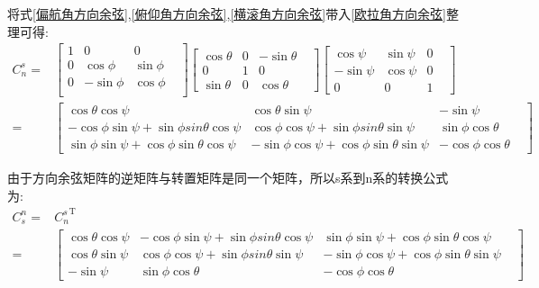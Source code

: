 \documentclass[12pt,a4paper]{article}
\begin{document}
将式\ref{偏航角方向余弦},\ref{俯仰角方向余弦},\ref{横滚角方向余弦}带入\ref{欧拉角方向余弦}整理可得:
\begin{equation}\label{欧拉角s转n}
    \begin{split} 
        C^s_n=&\left[\begin{matrix}
                1 &           0 &          0 & \\
                0 &  \cos{\phi} & \sin{\phi} & \\
                0 & -\sin{\phi} & \cos{\phi} & \\
                \end{matrix}\right]
                \left[\begin{matrix}
                \cos{\theta} & 0 & -\sin{\theta} & \\
                           0 & 1 &           0 & \\
                \sin{\theta} & 0 &  \cos{\theta} &
                \end{matrix}\right]
                \left[\begin{matrix}
                 \cos{\psi} & \sin{\psi} & 0 & \\
                -\sin{\psi} & \cos{\psi} & 0 & \\
                          0 &          0 & 1 &
                \end{matrix}\right] \\
                =&\left[\begin{matrix}
                \cos{\theta}\cos{\psi} & \cos{\theta}\sin{\psi} & -\sin{\psi} & \\
                -\cos{\phi}\sin{\psi}+\sin{\phi}sin{\theta}\cos{\psi} & \cos{\phi}\cos{\psi}+\sin{\phi}sin{\theta}\sin{\psi} & \sin{\phi}\cos{\theta} & \\
                 \sin{\phi}\sin{\psi} + \cos{\phi}\sin{\theta}\cos{\psi} & -\sin{\phi}\cos{\psi} + \cos{\phi}\sin{\theta}\sin{\psi} & -\cos{\phi}\cos{\theta} &
                \end{matrix}\right]
    \end{split}
\end{equation} 

由于方向余弦矩阵的逆矩阵与转置矩阵是同一个矩阵\cite{方向余弦阵}，所以s系到n系的转换公式为:
\begin{equation}\label{欧拉角s转n}
    \begin{split} 
        C^n_s=&{C^s_n}^\mathrm{T} \\
             =&\left[\begin{matrix}
                \cos{\theta}\cos{\psi} & -\cos{\phi}\sin{\psi}+\sin{\phi}sin{\theta}\cos{\psi} &  \sin{\phi}\sin{\psi} + \cos{\phi}\sin{\theta}\cos{\psi} & \\
                \cos{\theta}\sin{\psi} &  \cos{\phi}\cos{\psi}+\sin{\phi}sin{\theta}\sin{\psi} & -\sin{\phi}\cos{\psi} + \cos{\phi}\sin{\theta}\sin{\psi} & \\
                -\sin{\psi} & \sin{\phi}\cos{\theta} & -\cos{\phi}\cos{\theta} &
                \end{matrix}\right]
    \end{split}
\end{equation} 

\newpage
\renewcommand\refname{参考文献}
\centering %


\end{document}
